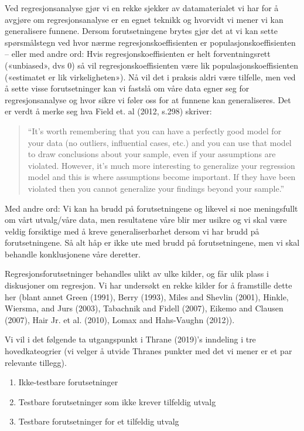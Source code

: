 \documentclass[
]{article}
\providecommand{\tightlist}{%
  \setlength{\itemsep}{0pt}\setlength{\parskip}{0pt}}
\begin{document}
Ved regresjonsanalyse gjør vi en rekke sjekker av datamaterialet vi har
for å avgjøre om regresjonsanalyse er en egnet teknikk og hvorvidt vi
mener vi kan generalisere funnene. Dersom forutsetningene brytes gjør
det at vi kan sette spørsmålstegn ved hvor nærme regresjonskoeffisienten
er populasjonskoeffisienten -- eller med andre ord: Hvis
regresjonskoeffisienten er helt forventningsrett («unbiased», dvs 0) så
vil regresjonskoeffisienten være lik populasjonskoeffisienten
(«estimatet er lik virkeligheten»). Nå vil det i praksis aldri være
tilfelle, men ved å sette visse forutsetninger kan vi fastslå om våre
data egner seg for regresjonsanalyse og hvor sikre vi føler oss for at
funnene kan generaliseres. Det er verdt å merke seg hva Field et. al
(2012, s.298) skriver:

\begin{quote}
``It's worth remembering that you can have a perfectly good model for
your data (no outliers, influential cases, etc.) and you can use that
model to draw conclusions about your sample, even if your assumptions
are violated. However, it's much more interesting to generalize your
regression model and this is where assumptions become important. If they
have been violated then you cannot generalize your findings beyond your
sample.''
\end{quote}

Med andre ord: Vi kan ha brudd på forutsetningene og likevel si noe
meningsfullt om vårt utvalg/våre data, men resultatene våre blir mer
usikre og vi skal være veldig forsiktige med å kreve generaliserbarhet
dersom vi har brudd på forutsetningene. Så alt håp er ikke ute med brudd
på forutsetningene, men vi skal behandle konklusjonene våre deretter.

Regresjonsforutsetninger behandles ulikt av ulke kilder, og får ulik
plass i diskusjoner om regresjon. Vi har undersøkt en rekke kilder for å
framstille dette her (blant annet Green (1991), Berry (1993), Miles and
Shevlin (2001), Hinkle, Wiersma, and Jurs (2003), Tabachnik and Fidell
(2007), Eikemo and Clausen (2007), Hair Jr. et al. (2010), Lomax and
Hahs-Vaughn (2012)).

Vi vil i det følgende ta utgangspunkt i Thrane (2019)'s inndeling i tre
hovedkateogrier (vi velger å utvide Thranes punkter med det vi mener er
et par relevante tillegg).

\begin{enumerate}
\def\labelenumi{\arabic{enumi}.}
\tightlist
\item
  Ikke-testbare forutsetninger
\item
  Testbare forutsetninger som ikke krever tilfeldig utvalg
\item
  Testbare forutsetninger for et tilfeldig utvalg
\end{enumerate}
\end{document}
